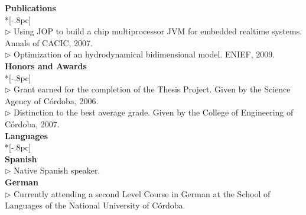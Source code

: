 \documentclass[a4paper,11pt,english]{article}
\begin{document}
\newpage
{\bf Publications} \\*[-.8pc]
\underline{\hspace{6in}} \\
$\triangleright$ Using JOP to build a chip multiprocessor JVM for embedded realtime systems. Annals of CACIC, 2007.\\
$\triangleright$ Optimization of an hydrodynamical bidimensional model. ENIEF, 2009.\\

{\bf Honors and Awards} \\*[-.8pc]
\underline{\hspace{6in}} \\
$\triangleright$ Grant earned for the completion of the Thesis Project.
Given by the Science Agency of C\'ordoba, 2006.\\ 
$\triangleright$ Distinction to the best average grade.
Given by the College of Engineering of C\'ordoba, 2007.\\
\newline
{\large \bf Languages} \\*[-.8pc]
\underline{\hspace{6in}} \\
{\bf Spanish}\\
$\triangleright$ Native Spanish speaker.
\\
{\bf German}\\
$\triangleright$ Currently attending a second Level Course in German 
at the School of Languages of the National University of C\'ordoba.
 \\
\end{document}
